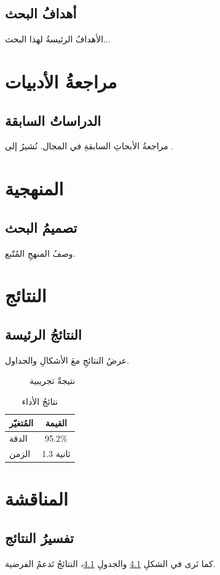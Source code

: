 \documentclass[12pt, a4paper]{book}
\begin{document}
\section{أهدافُ البحث}
الأهدافُ الرئيسةُ لهذا البحث...

\chapter{مراجعةُ الأدبيات}
\section{الدراساتُ السابقة}
مراجعةُ الأبحاثِ السابقةِ في المجال. نُشيرُ إلى \textcite{lamport1994}.

\chapter{المنهجية}
\section{تصميمُ البحث}
وصفُ المنهجِ المُتّبع.

\chapter{النتائج}
\section{النتائجُ الرئيسة}
عرضُ النتائجِ معَ الأشكالِ والجداول.

\begin{figure}[htbp]
\centering
{}
\caption{نتيجةٌ تجريبية}
\label{fig:result}
\end{figure}

\begin{table}[htbp]
\centering
\begin{tabular}{lc}
\toprule
المُتغيّر & القيمة \\
\midrule
الدقة & 95.2\% \\
الزمن & 1.3 ثانية \\
\bottomrule
\end{tabular}
\caption{نتائجُ الأداء}
\label{tab:results}
\end{table}

\chapter{المناقشة}
\section{تفسيرُ النتائج}
كما نَرى في الشكلِ \ref{fig:result} والجدولِ \ref{tab:results}، النتائجُ تَدعمُ الفرضية.
\end{document}
